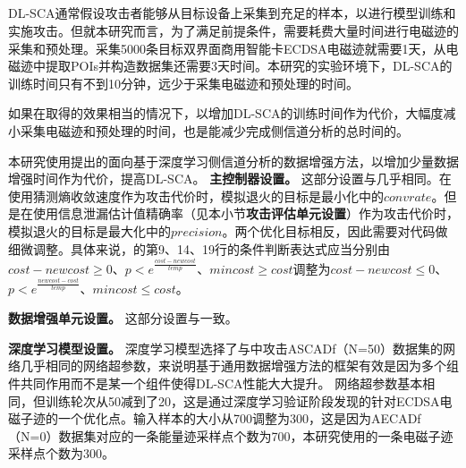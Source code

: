 {{	\subsection{\shujuzengqiang}\label{subs:useagmt}
	DL-SCA通常假设攻击者能够从目标设备上采集到充足的样本，以进行模型训练和实施攻击。但就本研究而言，为了满足前提条件，需要耗费大量时间进行电磁迹的采集和预处理。采集5000条目标双界面商用智能卡ECDSA电磁迹就需要1天，从电磁迹中提取POIs并构造数据集还需要3天时间。本研究的实验环境下，DL-SCA的训练时间只有不到10分钟，远少于采集电磁迹和预处理的时间。
	
	如果在取得的效果相当的情况下，以增加DL-SCA的训练时间作为代价，大幅度减小采集电磁迹和预处理的时间，也是能减少完成侧信道分析的总时间的。
	
	本研究使用提出的面向基于深度学习侧信道分析的数据增强方法，以增加少量数据增强时间作为代价，提高DL-SCA\zyx 。
	\textbf{主控制器设置。}
	这部分设置与几乎相同。在使用猜测熵收敛速度作为攻击代价时，模拟退火的目标是最小化中的$convrate$。但是在使用信息泄漏估计值精确率（见本小节\textbf{攻击评估单元设置}）作为攻击代价时，模拟退火的目标是最大化中的$precision$。两个优化目标相反，因此需要对代码做细微调整。具体来说，的第9、14、19行的条件判断表达式应当分别由$cost-newcost\ge0$、$p<e^{\frac{cost-newcost}{temp}}$、$mincost\ge cost$调整为$cost-newcost\le0$、$p<e^{\frac{newcost-cost}{temp}}$、$mincost\le cost$。
	
	\textbf{数据增强单元设置。}
	这部分设置与一致。
	
	\textbf{深度学习模型设置。}
	深度学习模型选择了与中攻击ASCADf（N=50）数据集的网络几乎相同的网络超参数，来说明基于通用数据增强方法的框架有效是因为多个组件共同作用而不是某一个组件使得DL-SCA性能大大提升。
	网络超参数基本相同，但训练轮次从50减到了20，这是通过深度学习验证阶段发现的针对ECDSA电磁子迹的一个优化点。输入样本的大小从700调整为300，这是因为AECADf（N=0）数据集对应的一条能量迹采样点个数为700，本研究使用的一条电磁子迹采样点个数为300。
	
	
}}
